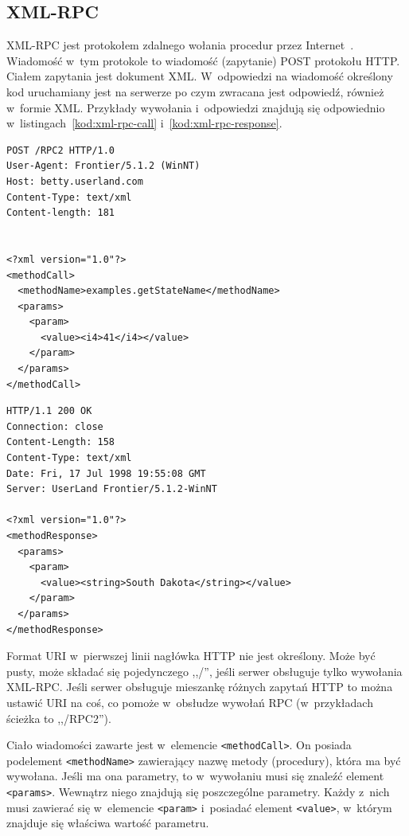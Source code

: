 \subsection{XML-RPC}
XML-RPC jest protokołem zdalnego wołania procedur przez Internet~\cite{xml-rpc}.
Wiadomość w~tym protokole to wiadomość (zapytanie) POST protokołu HTTP. Ciałem zapytania jest dokument XML.
W~odpowiedzi na wiadomość określony kod uruchamiany jest na serwerze po czym zwracana jest odpowiedź, również w~formie XML.
Przykłady wywołania i~odpowiedzi znajdują się odpowiednio w~listingach~\ref{kod:xml-rpc-call} i~\ref{kod:xml-rpc-response}.

\begin{lstlisting}[float, frame=single, caption={Wywołanie metody XML-RPC.}, label=kod:xml-rpc-call]
POST /RPC2 HTTP/1.0
User-Agent: Frontier/5.1.2 (WinNT)
Host: betty.userland.com
Content-Type: text/xml
Content-length: 181


<?xml version="1.0"?>
<methodCall>
  <methodName>examples.getStateName</methodName>
  <params>
    <param>
      <value><i4>41</i4></value>
    </param>
  </params>
</methodCall>
\end{lstlisting}

\begin{lstlisting}[float, frame=single, caption={Odpowiedź XML-RPC.}, label=kod:xml-rpc-response]
HTTP/1.1 200 OK
Connection: close
Content-Length: 158
Content-Type: text/xml
Date: Fri, 17 Jul 1998 19:55:08 GMT
Server: UserLand Frontier/5.1.2-WinNT

<?xml version="1.0"?>
<methodResponse>
  <params>
    <param>
      <value><string>South Dakota</string></value>
    </param>
  </params>
</methodResponse>
\end{lstlisting}

Format URI w~pierwszej linii nagłówka HTTP nie jest określony. Może być pusty, może składać się pojedynczego ,,/'', jeśli serwer obsługuje tylko wywołania XML-RPC. Jeśli serwer obsługuje mieszankę różnych zapytań HTTP to można ustawić URI na coś, co pomoże w~obsłudze wywołań RPC (w~przykładach ścieżka to ,,/RPC2'').

Ciało wiadomości zawarte jest w~elemencie \texttt{<methodCall>}. On posiada podelement \texttt{<methodName>} zawierający nazwę metody (procedury), która ma być wywołana.
Jeśli ma ona parametry, to w~wywołaniu musi się znaleźć element \texttt{<params>}. Wewnątrz niego znajdują się poszczególne parametry. Każdy z~nich musi zawierać się w~elemencie \texttt{<param>} i~posiadać element \texttt{<value>}, w~którym znajduje się właściwa wartość parametru.

